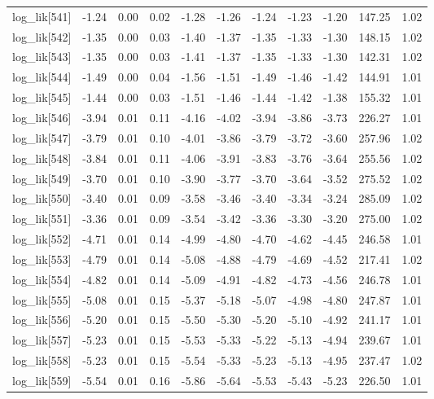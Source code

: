 \begin{table}[ht]
\begin{tabular}{rrrrrrrrrrr}
  log\_lik[541] & -1.24 & 0.00 & 0.02 & -1.28 & -1.26 & -1.24 & -1.23 & -1.20 & 147.25 & 1.02 \\ 
  log\_lik[542] & -1.35 & 0.00 & 0.03 & -1.40 & -1.37 & -1.35 & -1.33 & -1.30 & 148.15 & 1.02 \\ 
  log\_lik[543] & -1.35 & 0.00 & 0.03 & -1.41 & -1.37 & -1.35 & -1.33 & -1.30 & 142.31 & 1.02 \\ 
  log\_lik[544] & -1.49 & 0.00 & 0.04 & -1.56 & -1.51 & -1.49 & -1.46 & -1.42 & 144.91 & 1.01 \\ 
  log\_lik[545] & -1.44 & 0.00 & 0.03 & -1.51 & -1.46 & -1.44 & -1.42 & -1.38 & 155.32 & 1.01 \\ 
  log\_lik[546] & -3.94 & 0.01 & 0.11 & -4.16 & -4.02 & -3.94 & -3.86 & -3.73 & 226.27 & 1.01 \\ 
  log\_lik[547] & -3.79 & 0.01 & 0.10 & -4.01 & -3.86 & -3.79 & -3.72 & -3.60 & 257.96 & 1.02 \\ 
  log\_lik[548] & -3.84 & 0.01 & 0.11 & -4.06 & -3.91 & -3.83 & -3.76 & -3.64 & 255.56 & 1.02 \\ 
  log\_lik[549] & -3.70 & 0.01 & 0.10 & -3.90 & -3.77 & -3.70 & -3.64 & -3.52 & 275.52 & 1.02 \\ 
  log\_lik[550] & -3.40 & 0.01 & 0.09 & -3.58 & -3.46 & -3.40 & -3.34 & -3.24 & 285.09 & 1.02 \\ 
  log\_lik[551] & -3.36 & 0.01 & 0.09 & -3.54 & -3.42 & -3.36 & -3.30 & -3.20 & 275.00 & 1.02 \\ 
  log\_lik[552] & -4.71 & 0.01 & 0.14 & -4.99 & -4.80 & -4.70 & -4.62 & -4.45 & 246.58 & 1.01 \\ 
  log\_lik[553] & -4.79 & 0.01 & 0.14 & -5.08 & -4.88 & -4.79 & -4.69 & -4.52 & 217.41 & 1.02 \\ 
  log\_lik[554] & -4.82 & 0.01 & 0.14 & -5.09 & -4.91 & -4.82 & -4.73 & -4.56 & 246.78 & 1.01 \\ 
  log\_lik[555] & -5.08 & 0.01 & 0.15 & -5.37 & -5.18 & -5.07 & -4.98 & -4.80 & 247.87 & 1.01 \\ 
  log\_lik[556] & -5.20 & 0.01 & 0.15 & -5.50 & -5.30 & -5.20 & -5.10 & -4.92 & 241.17 & 1.01 \\ 
  log\_lik[557] & -5.23 & 0.01 & 0.15 & -5.53 & -5.33 & -5.22 & -5.13 & -4.94 & 239.67 & 1.01 \\ 
  log\_lik[558] & -5.23 & 0.01 & 0.15 & -5.54 & -5.33 & -5.23 & -5.13 & -4.95 & 237.47 & 1.02 \\ 
  log\_lik[559] & -5.54 & 0.01 & 0.16 & -5.86 & -5.64 & -5.53 & -5.43 & -5.23 & 226.50 & 1.01 \\ 

\end{tabular}
\end{table}
